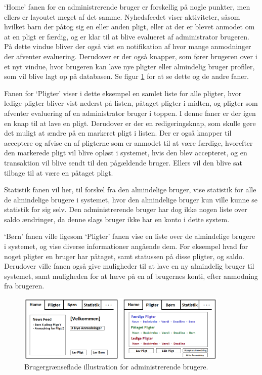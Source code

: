 ‘Home’ fanen for en administrerende bruger er forskellig på nogle punkter, men ellers er layoutet meget af det samme. Nyhedsfeedet viser aktiviteter, såsom hvilket barn der påtog sig en eller anden pligt, eller at der er blevet anmodet om at en pligt er færdig, og er klar til at blive evalueret af administrator brugeren. På dette vindue bliver der også vist en notifikation af hvor mange anmodninger der afventer evaluering. Derudover er der også knapper, som fører brugeren over i et nyt vindue, hvor brugeren kan lave nye pligter eller almindelig bruger profiler, som vil blive lagt op på databasen. Se figur \ref{ForalderUI} for at se dette og de andre faner.

Fanen for ‘Pligter’ viser i dette eksempel en samlet liste for alle pligter, hvor ledige pligter bliver vist nederst på listen, påtaget pligter i midten, og pligter som afventer evaluering af en administrator bruger i toppen. I denne faner er der igen en knap til at lave en pligt. Derudover er der en  redigeringsknap, som skulle gøre det muligt at ændre på en markeret pligt i listen. Der er også knapper til acceptere og afvise en af pligterne som er anmodet til at være færdige, hvorefter den markerede pligt vil blive opløst i systemet, hvis den blev accepteret, og en transaktion vil blive sendt til den pågældende bruger. Ellers vil den blive sat tilbage til at være en påtaget pligt. 

Statistik fanen vil her, til forskel fra den almindelige bruger, vise statistik for alle de almindelige brugere i systemet, hvor den almindelige bruger kun ville kunne se statistik for sig selv. Den administrerende bruger har dog ikke nogen liste over saldo ændringer, da denne slags bruger ikke har en konto i dette system. 

‘Børn’ fanen ville ligesom ‘Pligter’ fanen vise en liste over de almindelige brugere i systemet, og vise diverse informationer angående dem. For eksempel hvad for noget pligter en bruger har påtaget, samt statussen på disse pligter, og saldo. Derudover ville fanen også give muligheder til at lave en ny almindelig bruger til systemet, samt muligheden for at hæve på en af brugernes konti, efter anmodning fra brugeren.

\begin{figure}[H]
\centering
\includegraphics[width=0.9\textwidth]{Billeder/ForalderUI.png}
\caption{Brugergrænseflade illustration for administrerende brugere.}
\label{ForalderUI}
\end{figure}
